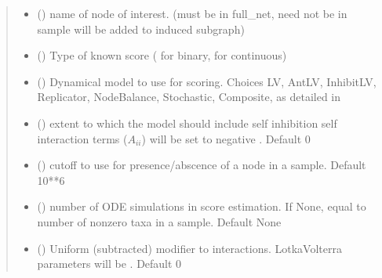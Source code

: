 \documentclass[letterpaper,10pt,english]{sphinxmanual}
\begin{document}
\begin{fulllineitems}
\begin{quote}
\begin{description}
\begin{itemize}
\item {} 
\sphinxAtStartPar
{} () \textendash{} name of node of interest. (must be in full\_net, need not be in sample \sphinxhyphen{} will be added to induced subgraph)

\item {} 
\sphinxAtStartPar
{} () \textendash{} Type of known score ( for binary,  for continuous)

\item {} 
\sphinxAtStartPar
{} () \textendash{} Dynamical model to use for scoring. Choices LV, AntLV, InhibitLV, Replicator, NodeBalance, Stochastic, Composite, as detailed in {\hyperref[\detokenize{friendlynets:friendlyNet.friendlyNet.score_node}]{}}

\item {} 
\sphinxAtStartPar
{} () \textendash{} extent to which the model should include self inhibition \sphinxhyphen{} self interaction terms (\(A_{ii}\)) will be set to negative . Default 0

\item {} 
\sphinxAtStartPar
{} () \textendash{} cutoff to use for presence/abscence of a node in a sample. Default 10**\sphinxhyphen{}6

\item {} 
\sphinxAtStartPar
{} () \textendash{} number of ODE simulations in score estimation. If None, equal to number of non\sphinxhyphen{}zero taxa in a sample. Default None

\item {} 
\sphinxAtStartPar
{} () \textendash{} Uniform (subtracted) modifier to interactions. Lotka\sphinxhyphen{}Volterra parameters will be {\hyperref[\detokenize{friendlynets:friendlyNet.friendlyNet.Adjacency}]{}} \sphinxhyphen{} . Default 0


\end{itemize}
\end{description}
\end{quote}
\end{fulllineitems}
\end{document}
